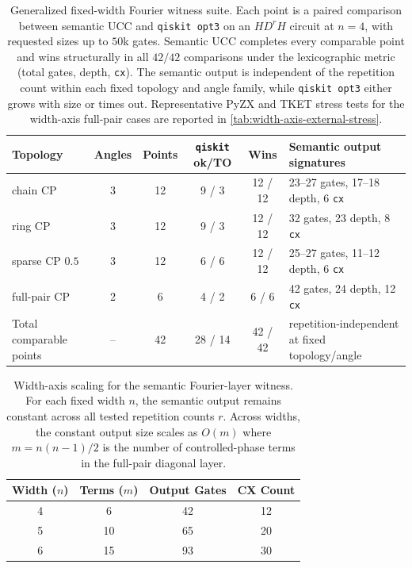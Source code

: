 \documentclass[11pt]{article}
\begin{document}
\begin{table}[t]
\centering
\scriptsize
\begin{tabularx}{\textwidth}{@{}lccccX@{}}
\toprule
Topology & Angles & Points & \texttt{qiskit} ok/TO & Wins & Semantic output signatures \\
\midrule
chain CP & 3 & 12 & 9 / 3 & 12 / 12 & 23--27 gates, 17--18 depth, 6 \texttt{cx} \\
ring CP & 3 & 12 & 9 / 3 & 12 / 12 & 32 gates, 23 depth, 8 \texttt{cx} \\
sparse CP $0.5$ & 3 & 12 & 6 / 6 & 12 / 12 & 25--27 gates, 11--12 depth, 6 \texttt{cx} \\
full-pair CP & 2 & 6 & 4 / 2 & 6 / 6 & 42 gates, 24 depth, 12 \texttt{cx} \\
\midrule
Total comparable points & -- & 42 & 28 / 14 & 42 / 42 & repetition-independent at fixed topology/angle \\
\bottomrule
\end{tabularx}
\caption{Generalized fixed-width Fourier witness suite. Each point is a paired comparison between semantic UCC and \texttt{qiskit opt3} on an $H D^r H$ circuit at $n=4$, with requested sizes up to $50$k gates. Semantic UCC completes every comparable point and wins structurally in all $42/42$ comparisons under the lexicographic metric (total gates, depth, \texttt{cx}). The semantic output is independent of the repetition count within each fixed topology and angle family, while \texttt{qiskit opt3} either grows with size or times out. Representative PyZX and TKET stress tests for the width-axis full-pair cases are reported in \cref{tab:width-axis-external-stress}.}
\label{tab:generalized-fourier-witness}
\end{table}

\begin{table}[t]
\centering
\small
\begin{tabular}{cccc}
\toprule
Width ($n$) & Terms ($m$) & Output Gates & CX Count \\
\midrule
4 & 6  & 42 & 12 \\
5 & 10 & 65 & 20 \\
6 & 15 & 93 & 30 \\
\bottomrule
\end{tabular}
\caption{Width-axis scaling for the semantic Fourier-layer witness. For each fixed width $n$, the semantic output remains constant across all tested repetition counts $r$. Across widths, the constant output size scales as $O(m)$ where $m = n(n-1)/2$ is the number of controlled-phase terms in the full-pair diagonal layer.}
\label{tab:width-axis-scaling}
\end{table}
\end{document}
